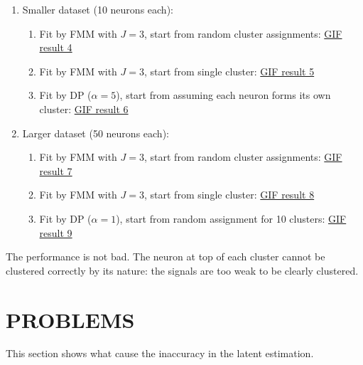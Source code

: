 \documentclass[]{article}
\begin{document}
\begin{enumerate}
	\def\labelenumi{(\arabic{enumi})}
	\item
	Smaller dataset (10 neurons each):\\
	\begin{enumerate}
		\def\labelenumi{\alph{enumi}.}
		\item
		Fit by FMM with \(J = 3\), start from random cluster assignments:
		\href{https://github.com/weigcdsb/state-space-clustering/blob/main/results/gif/noA_10_MM_above.gif}{GIF result 4}
		\item
		Fit by FMM with \(J = 3\), start from single cluster:
		\href{https://github.com/weigcdsb/state-space-clustering/blob/main/results/gif/noA_10_MM_below.gif}{GIF result 5}
		\item
		Fit by DP (\(\alpha = 5\)), start from assuming each neuron forms its own cluster:
		\href{https://github.com/weigcdsb/state-space-clustering/blob/main/results/gif/noA_10_DP_above_5.gif}{GIF result 6}
	\end{enumerate}
	
	\item
	Larger dataset (50 neurons each):\\
	\begin{enumerate}
		\def\labelenumi{\alph{enumi}.}
		\item
		Fit by FMM with \(J = 3\), start from random cluster assignments:
		\href{https://github.com/weigcdsb/state-space-clustering/blob/main/results/gif/noA_50_MM_above.gif}{GIF result 7}
		\item
		Fit by FMM with \(J = 3\), start from single cluster:
		\href{https://github.com/weigcdsb/state-space-clustering/blob/main/results/gif/noA_50_MM_below.gif}{GIF result 8}
		\item
		Fit by DP (\(\alpha = 1\)), start from random assignment for 10 clusters:
		\href{https://github.com/weigcdsb/state-space-clustering/blob/main/results/gif/noA_50_DP_above1.gif}{GIF result 9}
	\end{enumerate}
\end{enumerate}

The performance is not bad. The neuron at top of each cluster cannot be clustered correctly by its nature: the signals are too weak to be clearly clustered.

\section{PROBLEMS} \label{problems}
This section shows what cause the inaccuracy in the latent estimation. 
\end{document}
